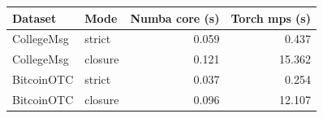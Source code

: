\begin{tabular*}{\columnwidth}{@{\extracolsep{\fill}}llrr@{}}
\toprule
Dataset & Mode & Numba core (s) & Torch mps (s) \\
\midrule
CollegeMsg & strict & 0.059 & 0.437 \\
CollegeMsg & closure & 0.121 & 15.362 \\
BitcoinOTC & strict & 0.037 & 0.254 \\
BitcoinOTC & closure & 0.096 & 12.107 \\
\bottomrule
\end{tabular*}

